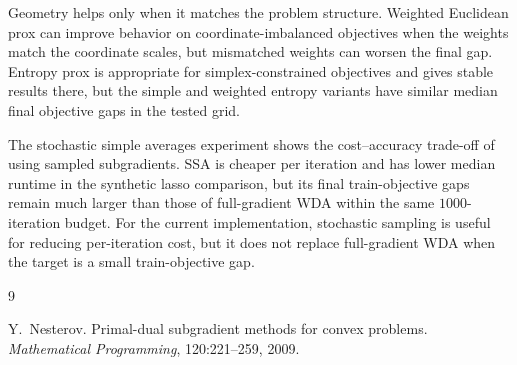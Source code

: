 \documentclass[11pt]{article}
\begin{document}
Geometry helps only when it matches the problem structure.  Weighted Euclidean
prox can improve behavior on coordinate-imbalanced objectives when the weights
match the coordinate scales, but mismatched weights can worsen the final gap.
Entropy prox is appropriate for simplex-constrained objectives and gives stable
results there, but the simple and weighted entropy variants have similar median
final objective gaps in the tested grid.

The stochastic simple averages experiment shows the cost--accuracy trade-off of
using sampled subgradients.  SSA is cheaper per iteration and has lower median
runtime in the synthetic lasso comparison, but its final train-objective gaps
remain much larger than those of full-gradient WDA within the same
\(1000\)-iteration budget.  For the current implementation, stochastic sampling
is useful for reducing per-iteration cost, but it does not replace full-gradient
WDA when the target is a small train-objective gap.

\begin{thebibliography}{9}

Y.~Nesterov.
\newblock Primal-dual subgradient methods for convex problems.
\newblock \emph{Mathematical Programming}, 120:221--259, 2009.

\end{thebibliography}
\end{document}
